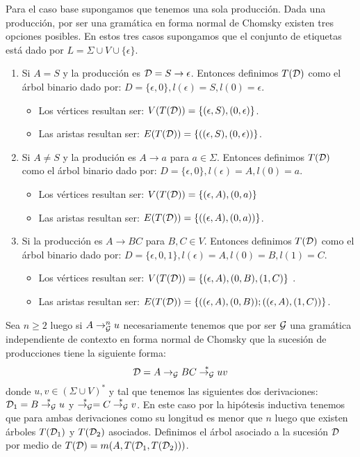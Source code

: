 \documentclass[tesis.tex]{subfiles}
\begin{document}
\begin{leoenv}
Para el caso base supongamos que tenemos una sola producción.
Dada una producción, por ser una gramática \ic en forma normal de Chomsky existen tres opciones posibles.
En estos tres casos supongamos que el conjunto de etiquetas está dado por $L = \Sigma \cup V \cup \{ \epsilon \}$. 
\begin{enumerate}
	\item Si $A=S$ y la producción es ${\cal D} = S \to \epsilon$.
		Entonces definimos $T({\cal D})$ como el árbol binario dado por:
		$D = \{ \epsilon, 0 \}, l(\epsilon) = S, 
		l(0) = \epsilon$.
		\begin{itemize}
			\item Los vértices resultan ser: $V(T({\cal D})) = \{ (\epsilon,S), (0, \epsilon) \}$.
			\item Las aristas resultan ser:
			$E(T({\cal D})) =\{ ((\epsilon,S), (0, \epsilon))\}$. 
		\end{itemize}
		
		

	\item Si $A \neq S$ y la produción es $A \to a$ para $a \in \Sigma$.
		Entonces definimos $T({\cal D})$ como el árbol binario dado por:
		$D = \{ \epsilon, 0 \}, l(\epsilon) = A, l(0) = a$.
		\begin{itemize}
			\item Los vértices resultan ser: $V(T({\cal D})) = \{ (\epsilon,A), (0, a) \}$ 
			\item Las aristas resultan ser: $E(T({\cal D})) =\{ ((\epsilon,A), (0, a))\}$.
		\end{itemize}
		

	\item Si la producción es $A \to BC$ para $B,C \in V$.
		Entonces definimos $T({\cal D})$ como el árbol binario dado por:
		$D=\{ \epsilon, 0, 1 \}, l(\epsilon) = A, l(0)=B, l(1) = C$.
		\begin{itemize}
			\item Los vértices resultan ser: $V(T({\cal D})) = \{ (\epsilon,A), (0, B), (1,C) \}$ .
			\item Las aristas resultan ser: $E(T({\cal D})) =\{ ((\epsilon,A), (0, B)); ((\epsilon,A),(1,C))\}$.
		\end{itemize}
\end{enumerate}

Sea $n \ge 2$ luego si $A \to_{{\cal G}}^{n} u$ necesariamente tenemos que por ser ${\cal G}$ una gramática independiente de contexto en forma normal de Chomsky que la sucesión de producciones tiene la siguiente forma:
\begin{equation*}
	{\cal D} = A \to_{{\cal G}} BC \overset{*}{\to_{\cal G}} uv
\end{equation*}
donde $u,v \in (\Sigma \cup V)^{*}$ y tal que tenemos las siguientes dos derivaciones: ${\cal D}_{1} = B \overset{*}{\to_{\cal G}} u$ y $\overset{*}{\to_{\cal G}} = C \overset{*}{\to_{\cal G}} v$.
En este caso por la hipótesis inductiva tenemos que para ambas derivaciones como su longitud es menor que $n$ luego que existen árboles $T({\cal D}_{1})$ y $T({\cal D}_{2})$ asociados.
Definimos el árbol asociado a la sucesión ${\cal D}$ por medio de 
$T({\cal D}) = m(A,T({\cal D}_{1},T({\cal D}_{2})))$.



\end{leoenv}
\end{document}
